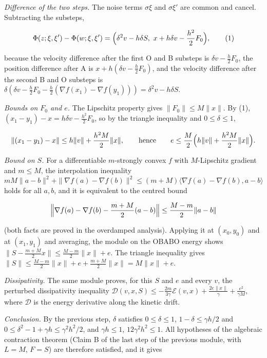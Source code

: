 \documentclass[11pt,a4paper]{article}
\begin{document}
\emph{Difference of the two steps.} The noise terms \(\sigma\xi\) and \(\sigma\xi'\) are common and cancel. Subtracting the substeps,


\[\Phi(z;\xi,\xi')-\Phi(w;\xi,\xi')=\Bigl(\delta^2v-h\delta S,\ x+h\delta v-\frac{h^2}2F_0\Bigr),\qquad(1)\]


because the velocity difference after the first O and B substeps is \(\delta v-\frac h2F_0\), the position difference after A is \(x+h(\delta v-\frac h2F_0)\), and the velocity difference after the second B and O substeps is \(\delta(\delta v-\frac h2F_0-\frac h2(\nabla f(x_1)-\nabla f(y_1)))=\delta^2v-h\delta S\).




\emph{Bounds on \(F_0\) and \(e\).} The Lipschitz property gives \(\|F_0\|\le M\|x\|\). By (1), \((x_1-y_1)-x=h\delta v-\frac{h^2}2F_0\), so by the triangle inequality and \(0\le\delta\le1\),


\[\|(x_1-y_1)-x\|\le h\|v\|+\frac{h^2M}2\|x\|,\qquad\text{hence}\qquad e\le\frac M2\Bigl(h\|v\|+\frac{h^2M}2\|x\|\Bigr).\]


\emph{Bound on \(S\).} For a differentiable \(m\)-strongly convex \(f\) with \(M\)-Lipschitz gradient and \(m\le M\), the interpolation inequality \(mM\|a-b\|^2+\|\nabla f(a)-\nabla f(b)\|^2\le(m+M)\langle\nabla f(a)-\nabla f(b),a-b\rangle\) holds for all \(a,b\), and it is equivalent to the centred bound


\[\Bigl\|\nabla f(a)-\nabla f(b)-\frac{m+M}2(a-b)\Bigr\|\le\frac{M-m}2\|a-b\|\]


(both facts are proved in the overdamped analysis). Applying it at \((x_0,y_0)\) and at \((x_1,y_1)\) and averaging, the module on the OBABO energy shows \(\|S-\frac{m+M}2x\|\le\frac{M-m}2\|x\|+e\). The triangle inequality gives \(\|S\|\le\frac{M-m}2\|x\|+e+\frac{m+M}2\|x\|=M\|x\|+e\).




\emph{Dissipativity.} The same module proves, for this \(S\) and \(e\) and every \(v\), the perturbed dissipativity inequality \(\mathcal D(v,x,S)\le-\frac{2m}{3\gamma}\mathcal E(v,x)+\frac{2e\|x\|}\gamma+\frac{e^2}{\gamma M}\), where \(\mathcal D\) is the energy derivative along the kinetic drift.




\emph{Conclusion.} By the previous step, \(\delta\) satisfies \(0\le\delta\le1\), \(1-\delta\le\gamma h/2\) and \(0\le\delta^2-1+\gamma h\le\gamma^2h^2/2\), and \(\gamma h\le1\), \(12\gamma^2h^2\le1\). All hypotheses of the algebraic contraction theorem (Claim B of the last step of the previous module, with \(L=M\), \(F=S\)) are therefore satisfied, and it gives
\end{document}
